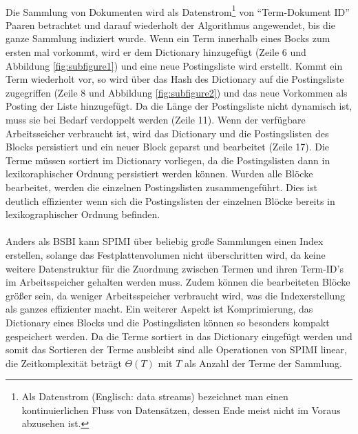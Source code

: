 \paragraph{}
 Die Sammlung von Dokumenten wird als Datenstrom\footnote{Als Datenstrom (Englisch: data streams) bezeichnet man einen kontinuierlichen Fluss von Datensätzen, dessen Ende meist nicht im Voraus abzusehen ist.} von \enquote{Term-Dokument ID} Paaren betrachtet und darauf wiederholt der Algorithmus angewendet, bis die ganze Sammlung indiziert wurde. Wenn ein Term innerhalb eines Bocks zum ersten mal vorkommt, wird er dem Dictionary hinzugefügt (Zeile 6 und Abbildung \ref{fig:subfigure1}) und eine neue Postingsliste wird erstellt. Kommt ein Term wiederholt vor, so wird über das Hash des Dictionary auf die Postingsliste zugegriffen (Zeile 8 und Abbildung \ref{fig:subfigure2}) und das neue Vorkommen als Posting der Liste hinzugefügt. Da die Länge der Postingsliste nicht dynamisch ist, muss sie bei Bedarf verdoppelt werden (Zeile 11). Wenn der verfügbare Arbeitsseicher verbraucht ist, wird das Dictionary und die Postingslisten des Blocks persistiert und ein neuer Block geparst und bearbeitet (Zeile 17). Die Terme müssen sortiert im Dictionary vorliegen, da die Postingslisten dann in lexikoraphischer Ordnung persistiert werden können. Wurden alle Blöcke bearbeitet, werden die einzelnen Postingslisten zusammengeführt. Dies ist deutlich effizienter wenn sich die Postingslisten der einzelnen Blöcke bereits in lexikographischer Ordnung befinden.\par

\paragraph{}
Anders als BSBI kann SPIMI über beliebig große Sammlungen einen Index erstellen, solange das Festplattenvolumen nicht überschritten wird, da keine weitere Datenstruktur für die Zuordnung zwischen Termen und ihren Term-ID's im Arbeitsspeicher gehalten werden muss. Zudem können die bearbeiteten Blöcke größer sein, da weniger Arbeitsspeicher verbraucht wird, was die Indexerstellung als ganzes effizienter macht. Ein weiterer Aspekt ist Komprimierung, das Dictionary eines Blocks und die Postingslisten können so besonders kompakt gespeichert werden. Da die Terme sortiert in das Dictionary eingefügt werden und somit das Sortieren der Terme ausbleibt sind alle Operationen von SPIMI linear, die Zeitkomplexität beträgt $\Theta(T)$ mit $T$ als Anzahl der Terme der Sammlung.


